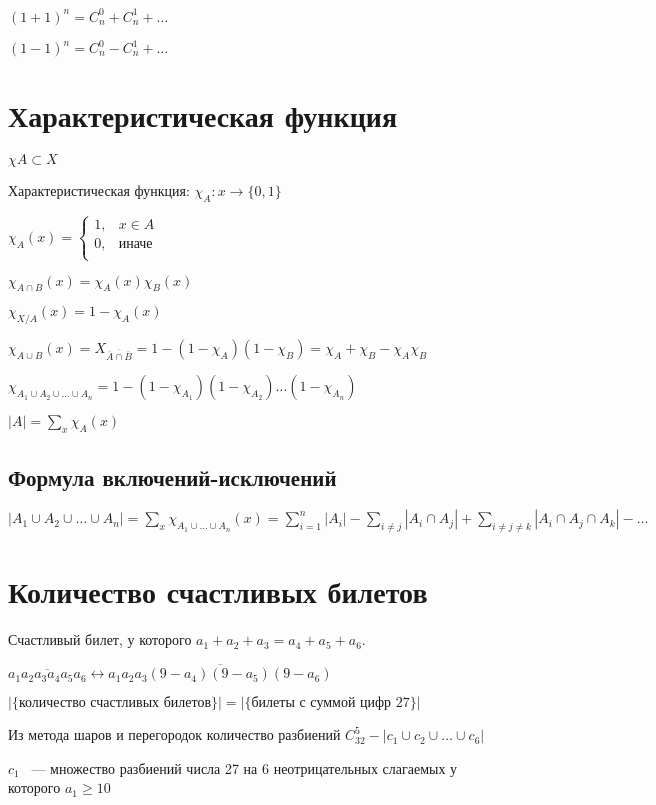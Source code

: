 \documentclass[12pt]{article}
\begin{document}
$(1 + 1)^n = C_n^0 + C_n^1 + \ldots$

$(1 - 1)^n = C_n^0 - C_n^1 + \ldots$

\section{Характеристическая функция}

$\mathbb \chi A \subset X$

Характеристическая функция: $\chi_A: x \to \{0, 1\}$

$\chi_A(x) = \begin{cases} 1, &x \in A\\ 0, & \text{иначе} \\ \end{cases}$

$\chi_{A\cap B} (x) = \chi_A(x)\chi_B(x)$

$\chi_{X/A}(x) = 1 - \chi_A(x)$

$\chi_{A\cup B}(x) = X_{\overline{\overline{A} \cap \overline{B}}} = 1 - (1 - \chi_{A})(1 - \chi_B) = \chi_{A} + \chi_{B} - \chi_A\chi_B$

$\chi_{A_1\cup A_2 \cup \ldots \cup A_n} = 1 - (1 - \chi_{A_1})(1 - \chi_{A_2})\ldots(1 - \chi_{A_n})$

$|A| = \sum_x\chi_A(x)$

\subsection{Формула включений-исключений}

$|A_1\cup A_2 \cup \ldots \cup A_n| = \sum_x\chi_{A_1\cup \ldots \cup A_n}(x) = \sum_{i = 1}^{n}|A_i| - \sum_{i \ne j}|A_i\cap A_j| + \sum_{i \ne j \ne k}|A_i\cap A_j \cap A_k| - \ldots$

\section{Количество счастливых билетов}

Счастливый билет, у которого $a_1 + a_2 + a_3 = a_4 + a_5 + a_6$.

$\overline{a_1a_2a_3a_4a_5a_6} \leftrightarrow \overline{a_1a_2a_3(9 - a_4)(9-a_5)(9-a_6)}$

$|\{\text{количество счастливых билетов}\}|= |\{\text{билеты с суммой цифр 27}\}|$


Из метода шаров и перегородок количество разбиений $C_{32}^5 - |c_1 \cup c_2 \cup \ldots \cup c_6|$

$c_1$ ~--- множество разбиений числа 27 на 6 неотрицательных слагаемых у которого $a_1 \ge 10$
\end{document}

